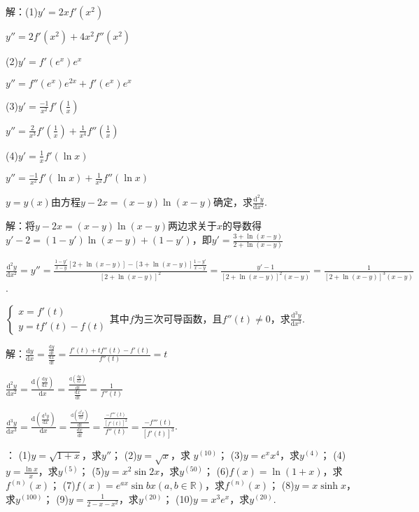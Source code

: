\documentclass[12pt,UTF8]{ctexart}
\begin{document}
\begin{enumerate}
解：(1)$y'=2xf'(x^2)$

$y''=2f'(x^2)+4x^2f''(x^2)$
%

(2)$y'=f'(e^x)e^x$

$y''=f''(e^x)e^{2x}+f'(e^x)e^x$
%

(3)$y'=\frac{-1}{x^2}f'(\frac1x)$

$y''=\frac{2}{x^3}f'(\frac1x)+\frac1{x^4}f''(\frac1x)$

(4)$y'=\frac1xf'(\ln x)$

$y''=\frac{-1}{x^2}f'(\ln x)+\frac1{x^2}f''(\ln x)$

$y=y(x)$由方程$y-2x=(x-y)\ln(x-y)$确定，求$\frac{\mathrm d^2y}{\mathrm dx^2}$.

解：将$y-2x=(x-y)\ln(x-y)$两边求关于$x$的导数得$y'-2=(1-y')\ln(x-y)+(1-y')$，即$y'=\frac{3+\ln(x-y)}{2+\ln(x-y)}$

$\frac{\mathrm d^2y}{\mathrm dx^2}=y''=\frac{\frac{1-y'}{x-y}[2+\ln(x-y)]-[3+\ln(x-y)]\frac{1-y'}{x-y}}{[2+\ln(x-y)]^2}=\frac{y'-1}{[2+\ln(x-y)]^2(x-y)}=\frac{1}{[2+\ln(x-y)]^3(x-y)}$.

$\begin{cases}
x=f'(t)\\
y=tf'(t)-f(t)
\end{cases}$其中$f$为三次可导函数，且$f''(t)\neq0$，求$\frac{\mathrm d^3y}{\mathrm dx^3}$.

解：$\frac{\mathrm dy}{\mathrm dx}=\frac{\frac{\mathrm dy}{\mathrm dt}}{\frac{\mathrm dx}{\mathrm dt}}=\frac{f'(t)+tf''(t)-f'(t)}{f''(t)}=t$

$\frac{\mathrm d^2y}{\mathrm dx^2}=\frac{\mathrm d(\frac{\mathrm dy}{\mathrm dx})}{\mathrm dx}=\frac{\frac{\mathrm d(\frac{\mathrm dy}{\mathrm dx})}{\mathrm dt}}{\frac{\mathrm dx}{\mathrm dt}}=\frac1{f''(t)}$

$\frac{\mathrm d^3y}{\mathrm dx^3}=\frac{\mathrm d(\frac{\mathrm d^2y}{\mathrm dx})}{\mathrm dx}=\frac{\frac{\mathrm d(\frac{\mathrm d^2y}{\mathrm dx})}{\mathrm dt}}{\frac{\mathrm dx}{\mathrm dt}}=\frac{\frac{-f'''(t)}{[f'(t)]^2}}{f''(t)}=\frac{-f'''(t)}{[f'(t)]^3}$.

：
\newline
(1)$y=\sqrt{1+x}$，求$y''$；
\newline
(2)$y=\sqrt x$，求 $y^{(10)}$；
\newline
(3)$y=e^xx^4$，求$y^{(4)}$；
\newline
(4)$y=\frac{\ln x}x$，求$y^{(5)}$；
\newline
(5)$y=x^2\sin2x$，求$y^{(50)}$；
\newline
(6)$f(x)=\ln(1+x)$，求$f^{(n)}(x)$；
\newline
(7)$f(x)=e^{ax}\sin bx(a,b\in\mathbb R)$，求$f^{(n)}(x)$；
\newline
(8)$y=x\sinh x$，求$y^{(100)}$；
\newline
(9)$y=\frac1{2-x-x^2}$，求$y^{(20)}$；
\newline
(10)$y=x^3e^x$，求$y^{(20)}$.


\end{enumerate}
\end{document}
